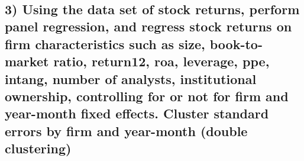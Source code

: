 \documentclass[11pt]{article}
\begin{document}
    \begin{center}
    \end{center}
    { \hspace*{\fill} \\}
    
    \hypertarget{using-the-data-set-of-stock-returns-perform-panel-regression-and-regress-stock-returns-on-firm-characteristics-such-as-size-book-to-market-ratio-return12-roa-leverage-ppe-intang-number-of-analysts-institutional-ownership-controlling-for-or-not-for-firm-and-year-month-fixed-effects.-cluster-standard-errors-by-firm-and-year-month-double-clustering}{%
\subsection{3) Using the data set of stock returns, perform panel
regression, and regress stock returns on firm characteristics such as
size, book-to-market ratio, return12, roa, leverage, ppe, intang, number
of analysts, institutional ownership, controlling for or not for firm
and year-month fixed effects. Cluster standard errors by firm and
year-month (double
clustering)}\label{using-the-data-set-of-stock-returns-perform-panel-regression-and-regress-stock-returns-on-firm-characteristics-such-as-size-book-to-market-ratio-return12-roa-leverage-ppe-intang-number-of-analysts-institutional-ownership-controlling-for-or-not-for-firm-and-year-month-fixed-effects.-cluster-standard-errors-by-firm-and-year-month-double-clustering}}
\end{document}
